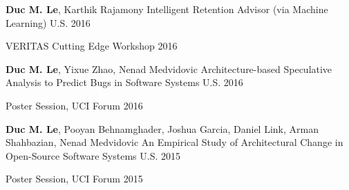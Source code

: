 
\begin{cventries}

\cventry
{\textbf{Duc M. Le}, Karthik Rajamony} %
{Intelligent Retention Advisor (via Machine Learning) } %
{U.S. } %
{2016} %
{
	\begin{cvitems} %
		\item VERITAS Cutting Edge Workshop 2016
	\end{cvitems}
}

\cventry
{\textbf{Duc M. Le}, Yixue Zhao, Nenad Medvidovic} %
{Architecture-based Speculative Analysis to Predict Bugs in Software Systems } %
{U.S.} %
{2016} %
{
	\begin{cvitems} %
		\item Poster Session, UCI Forum 2016
	\end{cvitems}
}

\cventry
{\textbf{Duc M. Le}, Pooyan Behnamghader, Joshua Garcia, Daniel	Link, Arman	Shahbazian, Nenad Medvidovic} %
{An Empirical Study of Architectural Change in Open-Source Software Systems} %
{U.S.} %
{2015} %
{
	\begin{cvitems} %
		\item Poster Session, UCI Forum 2015
	\end{cvitems}
}
\end{cventries}
